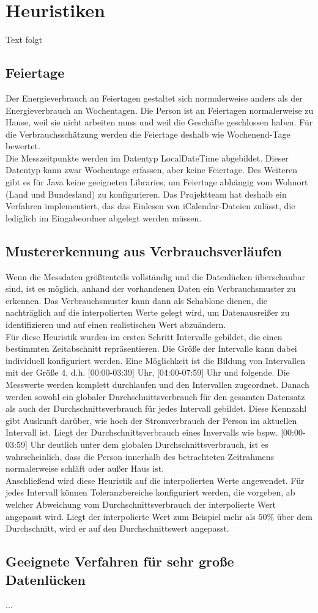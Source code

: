 \section{Heuristiken}
Text folgt

\subsection{Feiertage}
Der Energieverbrauch an Feiertagen gestaltet sich normalerweise anders als der Energieverbrauch an Wochentagen. Die Person ist an Feiertagen normalerweise zu Hause, weil sie nicht arbeiten muss und weil die Geschäfte geschlossen haben. Für die Verbrauchsschätzung werden die Feiertage deshalb wie Wochenend-Tage bewertet.\\
Die Messzeitpunkte werden im Datentyp LocalDateTime abgebildet. Dieser Datentyp kann zwar Wochentage erfassen, aber keine Feiertage. Des Weiteren gibt es für Java keine geeigneten Libraries, um Feiertage abhängig vom Wohnort (Land und Bundesland) zu konfigurieren. Das Projektteam hat deshalb ein Verfahren implementiert, das das Einlesen von iCalendar-Dateien zulässt, die lediglich im Eingabeordner abgelegt werden müssen.

\subsection{Mustererkennung aus Verbrauchsverläufen}
Wenn die Messdaten größtenteils vollständig und die Datenlücken überschaubar sind, ist es möglich, anhand der vorhandenen Daten ein Verbrauchsmuster zu erkennen. Das Verbrauchsmuster kann dann als Schablone dienen, die nachträglich auf die interpolierten Werte gelegt wird, um Datenausreißer zu identifizieren und auf einen realistischen Wert abzuändern.\\
Für diese Heuristik wurden im ersten Schritt Intervalle gebildet, die einen bestimmten Zeitabschnitt repräsentieren. Die Größe der Intervalle kann dabei individuell konfiguriert werden. Eine Möglichkeit ist die Bildung von Intervallen mit der Größe 4, d.h. [00:00-03:39] Uhr, [04:00-07:59] Uhr und folgende. Die Messwerte werden komplett durchlaufen und den Intervallen zugeordnet. Danach werden sowohl ein globaler Durchschnittsverbrauch für den gesamten Datensatz als auch der Durchschnittsverbrauch für jedes Intervall gebildet. Diese Kennzahl gibt Auskunft darüber, wie hoch der Stromverbrauch der Person im aktuellen Intervall ist. Liegt der Durchschnittsverbrauch eines Invervalls wie bspw. [00:00-03:59] Uhr deutlich unter dem globalen Durchschnittsverbrauch, ist es wahrscheinlich, dass die Person innerhalb des betrachteten Zeitrahmens normalerweise schläft oder außer Haus ist.\\
Anschließend wird diese Heuristik auf die interpolierten Werte angewendet. Für jedes Intervall können Toleranzbereiche konfiguriert werden, die vorgeben, ab welcher Abweichung vom Durchschnittsverbrauch der interpolierte Wert angepasst wird. Liegt der interpolierte Wert zum Beispiel mehr als $50\%$ über dem Durchschnitt, wird er auf den Durchschnittswert angepasst.

\subsection{Geeignete Verfahren für sehr große Datenlücken}
...

